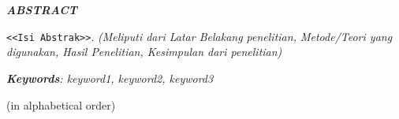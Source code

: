 \chapter*{\MakeUppercase{\textit{\judulInggris}}}
\singlespacing
\begin{center}
    
    \vspace{-4em}
    
    \penulis
    
	\bigskip
    
    \textit{\textbf{ABSTRACT}}
    
\end{center}


\vspace*{0.2cm}
{
	\setlength{\parindent}{0pt}

	\bigskip
	\bigskip


\verb|<<Isi Abstrak>>|. \textit{(Meliputi dari Latar Belakang penelitian, Metode/Teori yang digunakan, Hasil Penelitian, Kesimpulan dari penelitian)}
	\bigskip
 
	\textit{\textbf{Keywords}: keyword1, keyword2, keyword3}	
} (in alphabetical order)

\onehalfspacing